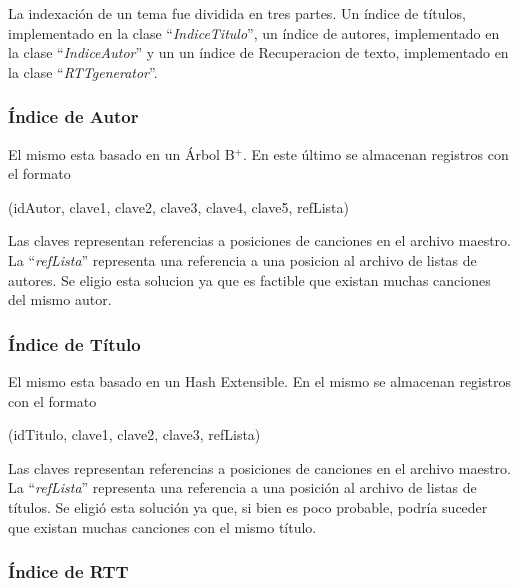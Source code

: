 \documentclass{article}
\begin{document}
	La indexación de un tema fue dividida en tres partes. Un índice de títulos, implementado en la clase ``\textit{IndiceTitulo}'', un índice de autores, implementado en la clase ``\textit{IndiceAutor}'' y un un índice de Recuperacion de texto, implementado en la clase ``\textit{RTTgenerator}''.
\bigskip



\subsubsection{Índice de Autor}
\medskip

	El mismo esta basado en un Árbol B$^+$. En este último se almacenan registros con el formato 
	\bigskip

	{\ttfamily\footnotesize
	(idAutor, clave1, clave2, clave3, clave4, clave5, refLista) \\}

	Las claves representan referencias a posiciones de canciones en el archivo maestro. La ``\textit{refLista}'' representa una referencia a una posicion al archivo de listas de autores. Se eligio esta solucion ya que es factible que existan muchas canciones del mismo autor.
\bigskip



\subsubsection{Índice de Título}
\medskip

	El mismo esta basado en un Hash Extensible. En el mismo se almacenan registros con el formato 
	\bigskip

	{\ttfamily\footnotesize
	(idTitulo, clave1, clave2, clave3, refLista) \\}

	Las claves representan referencias a posiciones de canciones en el archivo maestro. La ``\textit{refLista}'' representa una referencia a una posición al archivo de listas de títulos. Se eligió esta solución ya que, si bien es poco probable, podría suceder que existan muchas canciones con el mismo título.
\bigskip



\subsubsection{Índice de RTT}
\medskip
\end{document}
